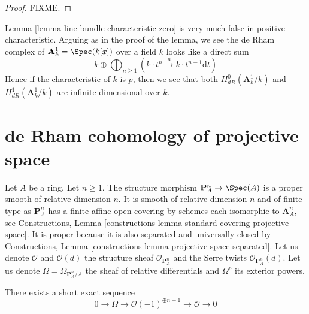 \begin{proof}
FIXME.
\end{proof}

\begin{example}
\label{example-affine-line}
Lemma \ref{lemma-line-bundle-characteristic-zero} is very much
false in positive characteristic. Arguing as in the proof
of the lemma, we see the de Rham complex
of $\mathbf{A}^1_k = \Spec(k[x])$ over a field $k$ looks like a direct sum
$$
k \oplus
\bigoplus\nolimits_{n \geq 1}
(k \cdot t^n \xrightarrow{n}
k \cdot t^{n - 1} \text{d}t)
$$
Hence if the characteristic of $k$ is $p$, then
we see that both $H^0_{dR}(\mathbf{A}^1_k/k)$ and
$H^1_{dR}(\mathbf{A}^1_k/k)$
are infinite dimensional over $k$.
\end{example}








\section{de Rham cohomology of projective space}
\label{section-projective-space}

\noindent
Let $A$ be a ring. Let $n \geq 1$. The structure morphism
$\mathbf{P}^n_A \to \Spec(A)$ is a proper smooth of relative
dimension $n$. It is smooth of relative dimension $n$ and of finite type
as $\mathbf{P}^n_A$ has a finite affine open covering by schemes each
isomorphic to $\mathbf{A}^n_A$, see Constructions, Lemma
\ref{constructions-lemma-standard-covering-projective-space}.
It is proper because it is also separated and universally closed
by Constructions, Lemma \ref{constructions-lemma-projective-space-separated}.
Let us denote $\mathcal{O}$ and $\mathcal{O}(d)$ the structure sheaf
$\mathcal{O}_{\mathbf{P}^n_A}$ and the Serre twists
$\mathcal{O}_{\mathbf{P}^n_A}(d)$.
Let us denote $\Omega = \Omega_{\mathbf{P}^n_A/A}$ the sheaf
of relative differentials and $\Omega^p$ its exterior powers.

\begin{lemma}
\label{lemma-euler-sequence}
There exists a short exact sequence
$$
0 \to \Omega \to \mathcal{O}(-1)^{\oplus n + 1} \to \mathcal{O} \to 0
$$
\end{lemma}


